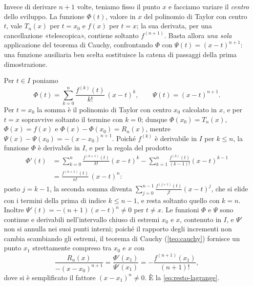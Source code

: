 \begin{strategia}
Invece di derivare $n+1$ volte, teniamo fisso il punto $x$ e facciamo variare il
\emph{centro} dello sviluppo. La funzione $\Phi(t)$, valore in $x$ del polinomio di Taylor
con centro $t$, vale $T_{n}(x)$ per $t=x_{0}$ e $f(x)$ per $t=x$; la sua derivata, per una
cancellazione «telescopica», contiene soltanto $f^{(n+1)}$. Basta allora \emph{una sola}
applicazione del teorema di Cauchy, confrontando $\Phi$ con $\Psi(t)=(x-t)^{n+1}$: una funzione
ausiliaria ben scelta sostituisce la catena di passaggi della prima dimostrazione.
\end{strategia}

\begin{dimostrazione}
Per $t\in I$ poniamo
\begin{equation}\label{eq:taylor-centro-variabile}
  \Phi(t)=\sum_{k=0}^{n}\frac{f^{(k)}(t)}{k!}\,(x-t)^{k}, \qquad \Psi(t)=(x-t)^{n+1} .
\end{equation}
Per $t=x_{0}$ la somma è il polinomio di Taylor con centro $x_{0}$ calcolato in $x$, e per
$t=x$ sopravvive soltanto il termine con $k=0$; dunque $\Phi(x_{0})=T_{n}(x)$, $\Phi(x)=f(x)$ e
$\Phi(x)-\Phi(x_{0})=R_{n}(x)$, mentre $\Psi(x)-\Psi(x_{0})=-(x-x_{0})^{n+1}$. Poiché $f^{(k)}$ è
derivabile in $I$ per $k\le n$, la funzione $\Phi$ è derivabile in $I$, e per la regola del
prodotto
\[
\begin{aligned}
  \Phi'(t)&=\sum_{k=0}^{n}\frac{f^{(k+1)}(t)}{k!}(x-t)^{k}
  -\sum_{k=1}^{n}\frac{f^{(k)}(t)}{(k-1)!}(x-t)^{k-1}\\
  &=\frac{f^{(n+1)}(t)}{n!}\,(x-t)^{n} :
\end{aligned}
\]
posto $j=k-1$, la seconda somma diventa $\sum_{j=0}^{n-1}\frac{f^{(j+1)}(t)}{j!}(x-t)^{j}$, che si elide
con i termini della prima di indice $k\le n-1$, e resta soltanto quello con $k=n$. Inoltre
$\Psi'(t)=-(n+1)(x-t)^{n}\neq0$ per $t\neq x$. Le funzioni $\Phi$ e $\Psi$ sono continue e derivabili
nell'intervallo chiuso di estremi $x_{0}$ e $x$, contenuto in $I$, e $\Psi'$ non si annulla
nei suoi punti interni; poiché il rapporto degli incrementi non cambia scambiando gli
estremi, il teorema di Cauchy (\cref{teo:cauchy}) fornisce un punto $x_{1}$ strettamente
compreso tra $x_{0}$ e $x$ con
\[
  \frac{R_{n}(x)}{-(x-x_{0})^{n+1}}=\frac{\Phi'(x_{1})}{\Psi'(x_{1})}=-\frac{f^{(n+1)}(x_{1})}{(n+1)!} ,
\]
dove si è semplificato il fattore $(x-x_{1})^{n}\neq0$. È la \eqref{eq:resto-lagrange}.
\end{dimostrazione}

